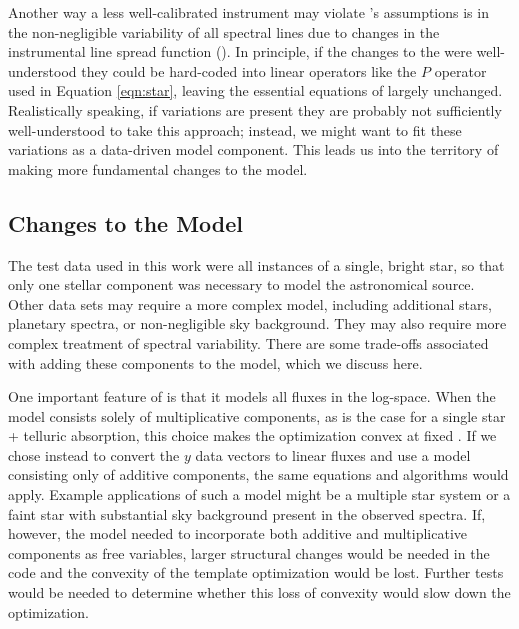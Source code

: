 \documentclass[modern]{aastex62}
\begin{document}
Another way a less well-calibrated instrument may violate \wobble's assumptions is in the non-negligible variability of all spectral lines due to changes in the instrumental line spread function (\LSF). 
In principle, if the changes to the \LSF were well-understood they could be hard-coded into linear operators like the $P$ operator used in Equation \ref{eqn:star}, leaving the essential equations of \wobble largely unchanged. 
Realistically speaking, if \LSF variations are present they are probably not sufficiently well-understood to take this approach; instead, we might want to fit these variations as a data-driven model component. 
This leads us into the territory of making more fundamental changes to the \wobble model.

\subsection{Changes to the Model}
\label{s:model-changes}
 
The test data used in this work were all instances of a single, bright star, so that only one stellar component was necessary to model the astronomical source. 
Other data sets may require a more complex model, including additional stars, planetary spectra, or non-negligible sky background. 
They may also require more complex treatment of spectral variability. 
There are some trade-offs associated with adding these components to the model, which we discuss here.

One important feature of \wobble is that it models all fluxes in the log-space. 
When the model consists solely of multiplicative components, as is the case for a single star + telluric absorption, this choice makes the optimization convex at fixed \RV. 
If we chose instead to convert the $y$ data vectors to linear fluxes and use a model consisting only of additive components, the same equations and algorithms would apply. 
Example applications of such a model might be a multiple star system or a faint star with substantial sky background present in the observed spectra. 
If, however, the model needed to incorporate both additive and multiplicative
components as free variables, larger structural changes would be needed in the code and the convexity of the template optimization would be lost. 
Further tests would be needed to determine whether this loss of convexity would slow down the optimization. 
\end{document}
